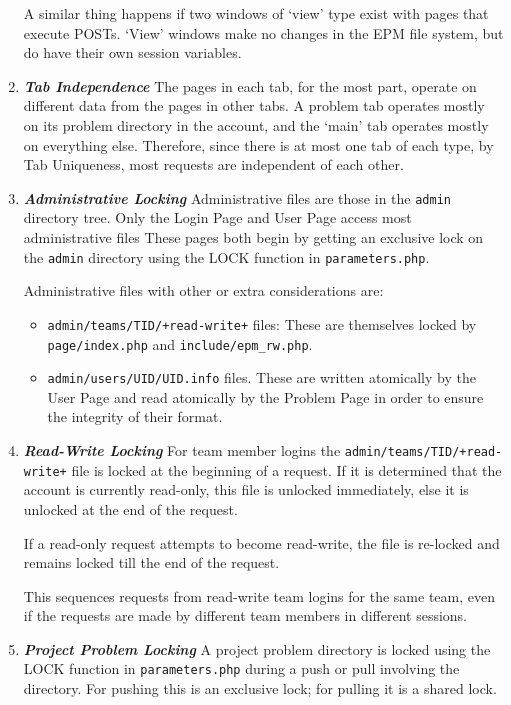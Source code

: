 \documentclass[12pt]{article}
\newcommand{\key}[1]{{\bf \em #1}}
\newcommand{\EOL}{\penalty \exhyphenpenalty}
\begin{document}
\begin{enumerate}
A similar thing happens if two windows of `view' type exist
with pages that execute POSTs.  `View' windows make no changes
in the EPM file system, but do have their own session variables.

\item \key{Tab Independence}
The pages in each
tab, for the most part, operate on different data from the pages
in other tabs.  A problem tab operates mostly on its problem
directory in the account, and the `main' tab operates mostly on
everything else.  Therefore, since there is at most one tab of
each type, by Tab Uniqueness, most requests are independent
of each other.

\item \key{Administrative Locking}
Administrative files are those in the {\tt admin} directory tree.
Only the Login Page and User Page access most administrative files
These pages both begin by getting an exclusive lock on the
{\tt admin} directory using the LOCK function in {\tt parameters.php}.

Administrative files with other or extra considerations are:
\begin{itemize}
\item {\tt admin/teams/TID/+read-write+} files: These are themselves
locked by {\tt page/\EOL index.php} and {\tt include/\EOL epm\_rw.php}.
\item {\tt admin/users/UID/UID.info} files.  These are written
atomically by the User Page and read atomically by the Problem Page
in order to ensure the integrity of their format.
\end{itemize}

\item \key{Read-Write Locking}
For team member logins the {\tt admin/teams/TID/+read-write+}
file is locked at the beginning of a request.  If it is
determined that the account is currently read-only, this file
is unlocked immediately, else it is unlocked at the end of the
request.

If a read-only request attempts to become read-write, the file
is re-locked and remains locked till the end of the request.

This sequences requests from read-write team logins for the
same team, even if the requests are made by different team
members in different sessions.

\item \key{Project Problem Locking}
A project problem directory is locked using the
LOCK function in {\tt parameters.php}
during a push or pull involving the directory.
For pushing this is an exclusive lock; for pulling it is a shared
lock.


\end{enumerate}
\end{document}
